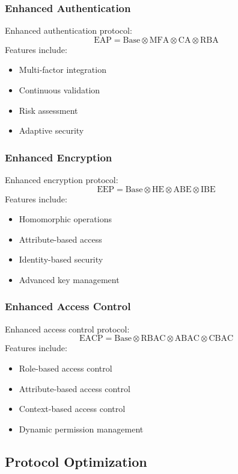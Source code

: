 \documentclass[12pt]{article}
\begin{document}
\subsubsection{Enhanced Authentication}
Enhanced authentication protocol:
\begin{equation}
\text{EAP} = \text{Base} \otimes \text{MFA} \otimes \text{CA} \otimes \text{RBA}
\end{equation}
Features include:
\begin{itemize}
\item Multi-factor integration
\item Continuous validation
\item Risk assessment
\item Adaptive security
\end{itemize}
\subsubsection{Enhanced Encryption}
Enhanced encryption protocol:
\begin{equation}
\text{EEP} = \text{Base} \otimes \text{HE} \otimes \text{ABE} \otimes \text{IBE}
\end{equation}
Features include:
\begin{itemize}
\item Homomorphic operations
\item Attribute-based access
\item Identity-based security
\item Advanced key management
\end{itemize}
\subsubsection{Enhanced Access Control}
Enhanced access control protocol:
\begin{equation}
\text{EACP} = \text{Base} \otimes \text{RBAC} \otimes \text{ABAC} \otimes \text{CBAC}
\end{equation}
Features include:
\begin{itemize}
\item Role-based access control
\item Attribute-based access control
\item Context-based access control
\item Dynamic permission management
\end{itemize}
\subsection{Protocol Optimization}
\end{document}
